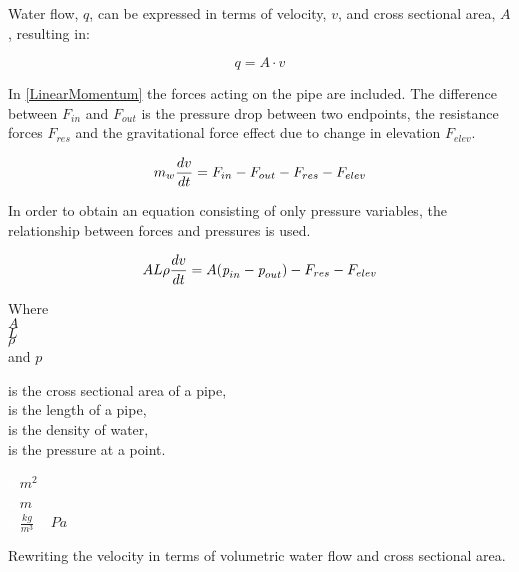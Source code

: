 Water flow, $q$, can be expressed in terms of velocity, $v$, and cross sectional 
area, $A$, resulting in:

\begin{equation}
  q=A \cdot v
	\label{EquationOfContinuity}
\end{equation}

 In \eqref{LinearMomentum} the forces acting on the pipe are included. The difference between $F_{in}$ and $F_{out}$ is the pressure drop between two endpoints, the resistance forces $F_{res}$ and the gravitational force effect due to change in elevation $F_{elev}$.

\begin{equation}
  m_w \frac{dv}{dt} = F_{in} - F_{out} - F_{res} - F_{elev} \\
  \label{LinearMomentum}
\end{equation}

In order to obtain an equation consisting of only pressure variables, the relationship between forces and pressures is used.


 \begin{equation}
    A L \rho \frac{dv}{dt} = A (\textit{p}_{in} - \textit{p}_{out}) - F_{res} - F_{elev} \\
\end{equation}

\begin{minipage}[t]{0.20\textwidth}
Where\\
\hspace*{8mm} $A$ \\
\hspace*{8mm} $L$ \\
\hspace*{8mm} $\rho$\\
and \hspace*{0.7mm} $p$ 
\end{minipage}
\begin{minipage}[t]{0.68\textwidth}
\vspace*{2mm}
is the cross sectional area of a pipe,\\
is the length of a pipe,\\
is the density of water,\\
is the pressure at a point.
\end{minipage}
\begin{minipage}[t]{0.10\textwidth}
\vspace*{2mm}
\textcolor{White}{te}$\unit{m^2}$\\
\textcolor{White}{te}$\unit{m}$\\
\textcolor{White}{te}$\unit{\frac{kg}{m^{3}}}$
\textcolor{White}{te}$\unit{Pa}$\\
\end{minipage}
%
Rewriting the velocity in terms of volumetric water flow and cross sectional 
area. 

